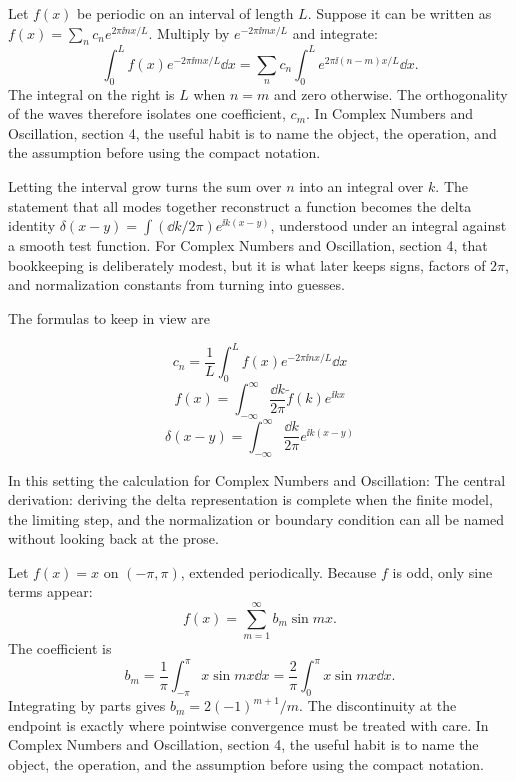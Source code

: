 Let \(f(x)\) be periodic on an interval of length \(L\).  Suppose it can be written as \(f(x)=\sum_n c_ne^{2\pi\ii nx/L}\).  Multiply by \(e^{-2\pi\ii mx/L}\) and integrate:
\[
  \int_0^L f(x)e^{-2\pi\ii mx/L}\dd x
  =
  \sum_n c_n\int_0^L e^{2\pi\ii(n-m)x/L}\dd x.
\]
The integral on the right is \(L\) when \(n=m\) and zero otherwise.  The orthogonality of the waves therefore isolates one coefficient, \(c_m\).  In Complex Numbers and Oscillation, section 4, the useful habit is to name the object, the operation, and the assumption before using the compact notation.

Letting the interval grow turns the sum over \(n\) into an integral over \(k\).  The statement that all modes together reconstruct a function becomes the delta identity \(\delta(x-y)=\int(\dd k/2\pi)e^{\ii k(x-y)}\), understood under an integral against a smooth test function.  For Complex Numbers and Oscillation, section 4, that bookkeeping is deliberately modest, but it is what later keeps signs, factors of \(2\pi\), and normalization constants from turning into guesses.

The formulas to keep in view are

\[
  c_n=\frac1L\int_0^L f(x)e^{-2\pi\ii nx/L}\dd x
\]
\[
  f(x)=\int_{-\infty}^{\infty}\frac{\dd k}{2\pi}\tilde f(k)e^{\ii kx}
\]
\[
  \delta(x-y)=\int_{-\infty}^{\infty}\frac{\dd k}{2\pi}e^{\ii k(x-y)}
\]

In this setting the calculation for Complex Numbers and Oscillation: The central derivation: deriving the delta representation is complete when the finite model, the limiting step, and the normalization or boundary condition can all be named without looking back at the prose.




\begin{example}
Let \(f(x)=x\) on \((-\pi,\pi)\), extended periodically.  Because \(f\) is odd, only sine terms appear:
\[
  f(x)=\sum_{m=1}^\infty b_m\sin mx.
\]
The coefficient is
\[
  b_m=\frac1\pi\int_{-\pi}^\pi x\sin mx\dd x
  =\frac2\pi\int_0^\pi x\sin mx\dd x.
\]
Integrating by parts gives \(b_m=2(-1)^{m+1}/m\).  The discontinuity at the endpoint is exactly where pointwise convergence must be treated with care.  In Complex Numbers and Oscillation, section 4, the useful habit is to name the object, the operation, and the assumption before using the compact notation.
\end{example}




